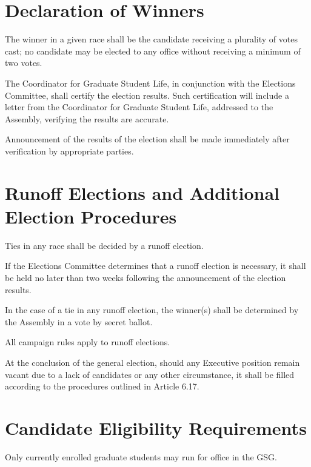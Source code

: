 \section{Declaration of Winners}
\begin{bylaws-number}
  \item The winner in a given race shall be the candidate receiving a plurality of votes cast; no candidate may be elected to any office without receiving a minimum of two votes.
  \item The Coordinator for Graduate Student Life, in conjunction with the Elections Committee, shall certify the election results. Such certification will include a letter from the Coordinator for Graduate Student Life, addressed to the Assembly, verifying the results are accurate.
  \item Announcement of the results of the election shall be made immediately after verification by appropriate parties.
\end{bylaws-number}

\section{Runoff Elections and Additional Election Procedures}
\begin{bylaws-number}
  \item Ties in any race shall be decided by a runoff election.
  \item If the Elections Committee determines that a runoff election is necessary, it shall be held no later than two weeks following the announcement of the election results.
  \item In the case of a tie in any runoff election, the winner(s) shall be determined by the Assembly in a vote by secret ballot.
  \item All campaign rules apply to runoff elections.
  \item At the conclusion of the general election, should any Executive position remain vacant due to a lack of candidates or any other circumstance, it shall be filled according to the procedures outlined in Article 6.17.
\end{bylaws-number}

\section{Candidate Eligibility Requirements}
Only currently enrolled graduate students may run for office in the GSG.
 
